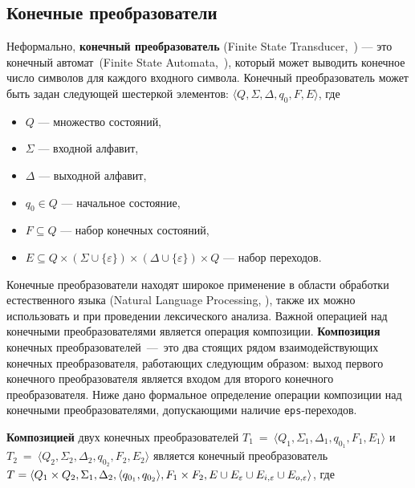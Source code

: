 \subsection{Конечные преобразователи}

Неформально, \textbf{конечный преобразователь} (Finite State Transducer,~\cite{FST}) {---} это конечный автомат~(Finite State Automata,~\cite{FSA}), который может выводить конечное число символов для каждого входного символа. Конечный преобразователь может быть задан следующей шестеркой элементов: $\langle Q, \Sigma, \Delta, q_0, F, E \rangle$, где

\begin{itemize}
\item $Q$ --- множество состояний, 
\item $\Sigma$ --- входной алфавит, 
\item $\Delta$ --- выходной алфавит, 
\item $q_0 \in Q$ --- начальное состояние, 
\item $F \subseteq Q$ --- набор конечных состояний, 
\item $E \subseteq Q \times (\Sigma \cup \{\varepsilon\}) \times (\Delta \cup \{\varepsilon\})  \times Q$ --- набор переходов. 
\end{itemize}

Конечные преобразователи находят широкое применение в области обработки естественного языка (Natural Language Processing, \cite{Mohri}), также их можно использовать и при проведении лексического анализа. Важной операцией над конечными преобразователями является операция композиции. \textbf{Композиция} конечных преобразователей~{---}~это два стоящих рядом  взаимодействующих конечных преобразователя, работающих следующим образом: выход первого конечного преобразователя является входом для второго конечного преобразователя. Ниже дано формальное определение операции композиции над конечными преобразователями, допускающими наличие \verb|eps|-переходов.

\textbf{Композицией} двух конечных преобразователей $T_1~=~\langle Q_1, \Sigma_1, \Delta_1, q_{0_{1}}, F_1, E_1 \rangle$ и $T_2~=~\langle Q_2, \Sigma_2, \Delta_2, q_{0_{2}}, F_2, E_2 \rangle$ является конечный преобразователь  $T =\langle Q_1  \times Q_2, \Sigma_1, \Delta_2, \\ \langle q_{0_{1}}, q_{0_{2}} \rangle, F_1 \times F_2, E \cup E_{\varepsilon} \cup E_{i,\varepsilon} \cup E_{o,\varepsilon} \rangle$, где 

